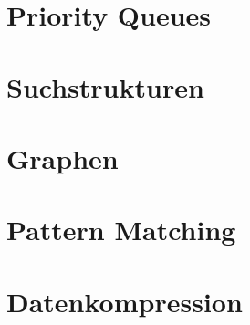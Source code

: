 \documentclass[12pt,a4paper]{article}
\begin{document}
\section{Priority Queues}
\section{Suchstrukturen}
\section{Graphen}
\section{Pattern Matching}
\section{Datenkompression}
\end{document}
